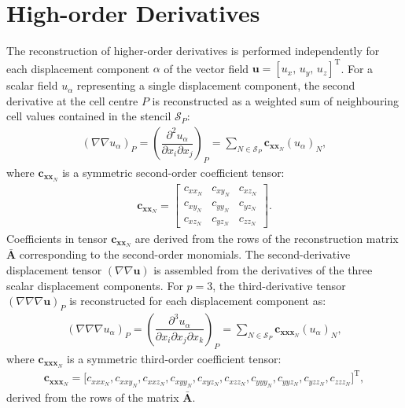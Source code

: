\documentclass[review,3p]{elsarticle}
\newcommand{\bb}{\boldsymbol}
\begin{document}
\section{High-order Derivatives}
\label{app:derivatives}
%
%
The reconstruction of higher-order derivatives is performed independently for each displacement component $\alpha$ of the vector field
$\bb{u} = [u_x,\,u_y,\,u_z]^{\mathrm{T}}$.
For a scalar field $u_{\alpha}$ representing a single displacement component, the second derivative at the cell centre $P$ is reconstructed as a weighted sum of neighbouring cell values contained in the stencil $\mathcal{S}_P$:
\begin{eqnarray}
	(\nabla \nabla {u_{\alpha}})_{P} = \left( \dfrac{\partial^2 u_{\alpha}}{\partial x_i \partial x_j} \right)_P
	= \sum_{N \in \mathcal{S}_P} \bb{c}_{{\bb{x}\bb{x}}_N} ({u}_{\alpha})_N,
	\label{eq:hessianComponent}
\end{eqnarray}
%
where $\bb{c}_{{\bb{x}\bb{x}}_N}$ is a symmetric second-order coefficient tensor:
%
\begin{eqnarray}
	\bb{c}_{{\bb{x}\bb{x}}_N} =
	\begin{bmatrix}
		c_{xx_N} & c_{xy_N} & c_{xz_N} \\
		c_{xy_N} & c_{yy_N} & c_{yz_N} \\
		c_{xz_N} & c_{yz_N} & c_{zz_N}
	\end{bmatrix}.
	\label{eq:secondTensor}
\end{eqnarray}
Coefficients in tensor $\bb{c}_{{\bb{x}\bb{x}}_N}$ are derived from the rows of the reconstruction matrix $\mathbf{\bar{A}}$ corresponding to the second-order monomials.
The second-derivative displacement tensor $(\nabla \nabla \bb{u})$ is assembled from the derivatives of the three scalar displacement components.
%
For $p = 3$, the third-derivative tensor $(\nabla \nabla \nabla \boldsymbol{u})_P$ is reconstructed for each displacement component as:
%
\begin{eqnarray}
	(\nabla \nabla \nabla {u}_{\alpha})_P = \left( \dfrac{\partial^3 u_{\alpha}}{\partial x_i \partial x_j \partial x_k} \right)_P
	= \sum_{N \in \mathcal{S}_P} \mathbf{c}_{\bb{x}\bb{x}\bb{x}_N}({u}_{\alpha})_N,
	\label{eq:thirdTensor}
\end{eqnarray}
where $\mathbf{c}_{\bb{x}\bb{x}\bb{x}_N}$ is a symmetric third-order coefficient tensor:
%
\begin{eqnarray}
	\mathbf{c}_{\bb{x}\bb{x}\bb{x}_N} =\big[c_{xxx_N},c_{xxy_N},c_{xxz_N},c_{xyy_N},c_{xyz_N},c_{xzz_N},c_{yyy_N},c_{yyz_N},c_{yzz_N},c_{zzz_N}\big]^{\mathrm{T}},
\end{eqnarray}
%
derived from the rows of the matrix $\mathbf{\bar{A}}$.
\end{document}
